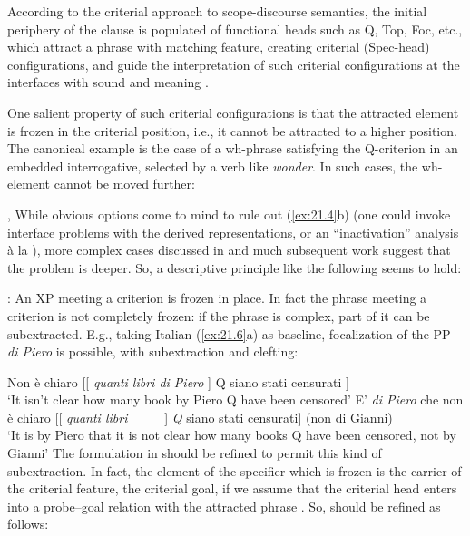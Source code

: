 \documentclass[output=paper]{langsci/langscibook}
\begin{document}
According to the criterial approach  to scope-discourse semantics, the initial
periphery of the clause is populated of functional heads such as Q, Top, Foc,
etc., which attract a phrase with matching feature, creating criterial
(Spec-head) configurations, and guide the interpretation of such criterial
configurations at the interfaces with sound and meaning \citep{Rizzi1997}.

One salient property of such criterial configurations is that the attracted
element is frozen in the criterial position, i.e., it cannot be attracted to a
higher position. The canonical example is the case of a wh-phrase satisfying
the Q-criterion in an embedded interrogative, selected by a verb like
\emph{wonder}. In such cases, the wh-element cannot be moved further:

\ea%
    \label{ex:21.4} \textcite{LasnikSaito1992}, \textcite{Boskovic2008}
    \z
\z
%
While obvious options come to mind to rule out (\ref{ex:21.4}b) (one could
invoke interface problems with the derived representations, or an
“inactivation” analysis à la \citealt{Boskovic2008}), more complex cases
discussed in \textcite{rizzicriterial,Rizzi2011} and much subsequent work suggest that the
problem is deeper. So, a descriptive principle like the following seems to
hold:

\ea%
    \label{ex:21.5}
    : An XP meeting a criterion is frozen in place.
\z
%
In fact the phrase meeting a criterion is not completely frozen: if the phrase
is complex, part of it can be subextracted. E.g., taking Italian
(\ref{ex:21.6}a) as baseline, focalization of the PP \emph{di Piero} is
possible, with subextraction and clefting:\pagebreak

\ea%
    \label{ex:21.6}
    \ea Non è chiaro   [[ \emph{quanti libri di Piero} ] Q siano stati censurati ]\\
        ‘It isn’t clear       how many book by Piero Q have been censored’
    \ex E’ \emph{di Piero} che non è chiaro [[ \emph{quanti libri} \_\_\_ ] \emph{Q}  siano stati censurati] (non di Gianni)\\
        ‘It is by Piero that it is not clear how many books Q have been censored, not by Gianni’
    \z
\z
%
The formulation in  should be refined to permit this kind of
subextraction. In fact, the element of the specifier which is frozen is the
carrier of the criterial feature, the criterial goal, if we assume that the
criterial head enters into a probe--goal relation with the attracted phrase
\citep{Chomsky2000}. So,  should be refined as follows:
\end{document}
